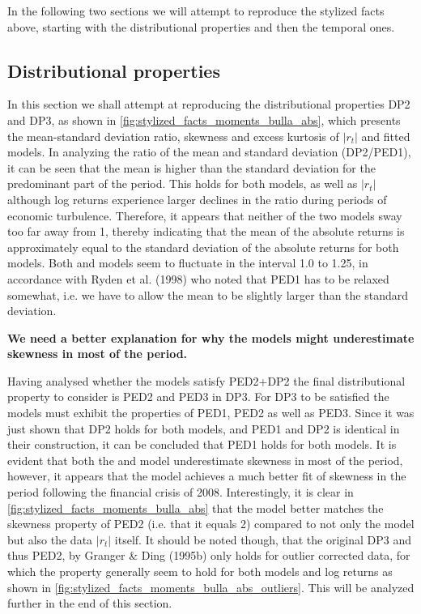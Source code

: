 In the following two sections we will attempt to reproduce the stylized facts above, starting with the distributional properties and then the temporal ones.

\subsection{Distributional properties}
\label{Sec: Distributional properties}

In this section we shall attempt at reproducing the distributional properties DP2 and DP3, as shown in \cref{fig:stylized_facts_moments_bulla_abs}, which presents the mean-standard deviation ratio, skewness and excess kurtosis of $|r_t|$ and fitted models. In analyzing the ratio of the mean and standard deviation (DP2/PED1), it can be seen that the mean is higher than the standard deviation for the predominant part of the period. This holds for both models, as well as $|r_t|$ although log returns experience larger declines in the ratio during periods of economic turbulence. Therefore, it appears that neither of the two models sway too far away from 1, thereby indicating that the mean of the absolute returns is approximately equal to the standard deviation of the absolute returns for both models. Both \mle and \jump models seem to fluctuate in the interval 1.0 to 1.25, in accordance with Ryden et al. (1998) who noted that PED1 has to be relaxed somewhat, i.e. we have to allow the mean to be slightly larger than the standard deviation.

\textbf{We need a better explanation for why the models might underestimate skewness in most of the period.}

Having analysed whether the models satisfy PED2+DP2 the final distributional property to consider is PED2 and PED3 in DP3. For DP3 to be satisfied the models must exhibit the properties of PED1, PED2 as well as PED3. Since it was just shown that DP2 holds for both models, and PED1 and DP2 is identical in their construction, it can be concluded that PED1 holds for both models. It is evident that both the \mle and \jump model underestimate skewness in most of the period, however, it appears that the \jump model achieves a much better fit of skewness in the period following the financial crisis of 2008. Interestingly, it is clear in \cref{fig:stylized_facts_moments_bulla_abs} that the \mle model better matches the skewness property of PED2 (i.e. that it equals 2) compared to not only the \jump model but also the data $|r_t|$ itself. It should be noted though, that the original DP3 and thus PED2, by Granger \& Ding (1995b) only holds for outlier corrected data, for which the property generally seem to hold for both models and log returns as shown in \cref{fig:stylized_facts_moments_bulla_abs_outliers}. This will be analyzed further in the end of this section.

